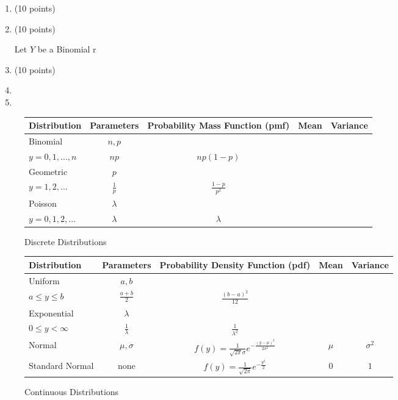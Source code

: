 \documentclass[12pt]{article}
\begin{document}
\pagebreak

\begin{enumerate}
\item (10 points) 

\pagebreak

\item (10 points)

\pagebreak Let $Y$ be a Binomial r

\item (10 points) 

\pagebreak

\item 
\pagebreak

\item

\end{enumerate}

\pagebreak


\begin{figure}[H]
\caption{Discrete Distributions}
\begin{tabular}{l c c c c}
\hline
Distribution & Parameters & Probability Mass Function (pmf) & Mean & Variance \\
\hline
Binomial & $n, p$ & \makecell{ $\displaystyle p(y) = \binom{n}{y}p^y(1-p)^{n-y}$\\$ \displaystyle y = 0, 1, \dots, n$} & $np$ & $np(1-p)$ \\
Geometric & $p$ & \makecell{ $\displaystyle p(y) = (1-p)^{y-1}p$ \\ $y = 1, 2, \dots$} & $ \displaystyle \frac{1}{p}$ & $\displaystyle \frac{1 - p}{p^2}$ \\
Poisson & $\lambda$ & \makecell{ $\displaystyle p(y) = \frac{e^{-\lambda} \lambda^y }{y!}$ \\ $y = 0, 1, 2, \dots$ } & $\lambda$ & $\lambda$ \\
\end{tabular}
\end{figure}

\vspace{2cm}

\begin{figure}[H]
\caption{Continuous Distributions}
\begin{tabular}{l c c c c}
\hline
Distribution & Parameters & Probability Density Function (pdf) & Mean & Variance \\
\hline
Uniform & $a, b$ & \makecell{ $\displaystyle f(y) = \frac{1}{b-a}$ \\ $a \leq y \leq b$ }& $\displaystyle \frac{a + b}{2}$ & $\displaystyle \frac{(b - a)^2}{12}$ \\
Exponential & $\lambda$ & \makecell{ $\displaystyle f(y) = \lambda e^{-\lambda y}$ \\ $0 \leq y < \infty$} & $\displaystyle \frac{1}{\lambda}$ & $\displaystyle \frac{1}{\lambda^2}$ \\
Normal & $\mu, \sigma$ & $\displaystyle f(y) = \frac{1}{\sqrt{2 \pi}\sigma}e^{- \frac{(y - \mu)^2}{2 \sigma^2}}$ & $\mu$ & $\sigma^2$ \\
Standard Normal & none & $\displaystyle f(y) = \frac{1}{\sqrt{2 \pi}}e^{- \frac{y^2}{2}}$ & $0$ & $1$ \\
\end{tabular}
\end{figure}
\end{document}

